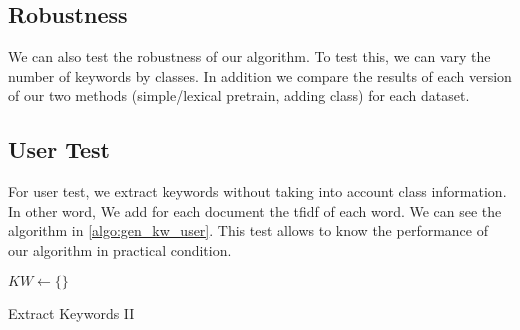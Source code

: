 \subsection{Robustness}
We can also test the robustness of our algorithm. To test this, we
can vary the number of keywords by classes. In addition we compare
the results of each version of our two methods (simple/lexical pretrain, adding 
class) for each dataset.

\subsection{User Test}
For user test, we extract keywords without taking into account class information. In other 
word, We add for each document the tfidf of each word. We can see the algorithm in 
\ref{algo:gen_kw_user}. This test allows to know the performance of our algorithm
in practical condition.
\begin{algorithm}
  $KW \gets \{\}$\\
  \caption{\label{algo:gen_kw_user}Extract Keywords II}
\end{algorithm}